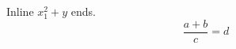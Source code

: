\documentclass{article}
\begin{document}
Inline $x_1^2 + y$ ends.
\[\frac{a+b}{c}=d\]
\end{document}
